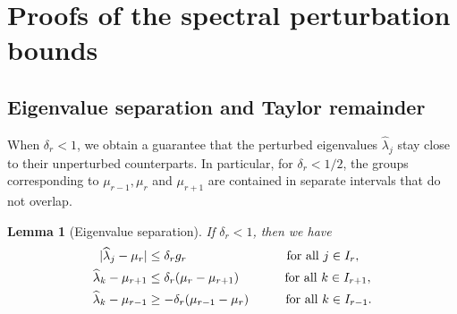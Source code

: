 \documentclass[a4paper,11pt]{article} %
\numberwithin{equation}{section}
\theoremstyle{definition}
\theoremstyle{remark}
\theoremstyle{plain}
\newtheorem{lemma}[definition]{Lemma}
\begin{document}


\section{Proofs of the spectral perturbation bounds}%
\label{sec_ProofsOfThePerturbationBounds}

\subsection{Eigenvalue separation and Taylor remainder}%
\label{ssec_EigenvalueSeparationAndTaylorRemainder}

When \( \delta_{r} < 1 \), we obtain a guarantee that the perturbed eigenvalues \( \widehat{ \lambda }_{j} \) stay close to their unperturbed counterparts.
In particular, for \( \delta_{r} < 1/2 \), the groups corresponding to \( \mu_{r-1}, \mu_{r} \) and \( \mu_{r + 1} \) are contained in separate intervals that do not overlap.

\begin{lemma}[Eigenvalue separation]%
  \label{lem_EigenvalueSeparation}
  If \( \delta_{r} < 1 \), then we have 
  \begin{align}
            | \widehat{ \lambda }_{j} - \mu_{r} | 
    & \le
            \delta_{r} g_{r} 
            \qquad \qquad \qquad
            \qquad \text{for all } j \in I_{r},
    \\
            \widehat{ \lambda }_{k} - \mu_{r + 1} 
    & \le 
            \delta_{r} ( \mu_{r} - \mu_{r + 1} ) 
            \quad \qquad \ \ \text{for all } k \in I_{r + 1},
    \notag
    \\
            \widehat{ \lambda }_{k} - \mu_{r - 1} 
    & \ge
            - \delta_{r} ( \mu_{r - 1} - \mu_{r} ) 
            \qquad \ \ \; \text{for all } k \in I_{r - 1}.
    \notag
  \end{align}
\end{lemma}%
\end{document}
